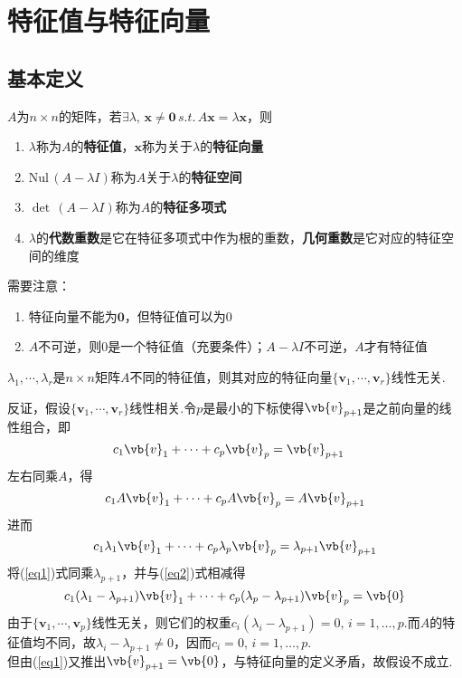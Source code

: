 
\section{特征值与特征向量}
\subsection{基本定义}
\begin{definition}$A$为$n\times n$的矩阵，若$\exists\lambda,\,\mathbf{x}\ne\mathbf{0}\,s.t.\,A\mathbf{x}=\lambda\mathbf{x}$，则
\begin{enumerate}
	\itemsep -2pt
	\item $\lambda$称为$A$的\textbf{特征值}，$\mathbf{x}$称为关于$\lambda$的\textbf{特征向量}
	\item $\mathrm{Nul}\,(A-\lambda I)$称为$A$关于$\lambda$的\textbf{特征空间}
	\item $\det\,(A-\lambda I)$称为$A$的\textbf{特征多项式}
	\item $\lambda$的\textbf{代数重数}是它在特征多项式中作为根的重数，\textbf{几何重数}是它对应的特征空间的维度
\end{enumerate}
\end{definition}
需要注意：
\begin{enumerate}
	\itemsep -3pt
	\item 特征向量不能为$\mathbf{0}$，但特征值可以为$0$
	\item $A$不可逆，则$0$是一个特征值（充要条件）；$A-\lambda I$不可逆，$A$才有特征值
\end{enumerate}
\begin{theorem}
\label{distinct_lambda}
$\lambda_1,\cdots,\lambda_r$是$n\times n$矩阵$A$不同的特征值，则其对应的特征向量$\{\mathbf{v}_1,\cdots,\mathbf{v}_r\}$线性无关.
\end{theorem}
\begin{analysis}
反证，假设$\{\mathbf{v}_1,\cdots,\mathbf{v}_r\}$线性相关.令$p$是最小的下标使得$\vb{v}_{p+1}$是之前向量的线性组合，即
\begin{equation}\label{eq1} c_1\vb{v}_1+\cdots+c_p\vb{v}_p=\vb{v}_{p+1}\quad\end{equation}
左右同乘$A$，得
\[c_1A\vb{v}_1+\cdots+c_pA\vb{v}_p=A\vb{v}_{p+1}\]
进而
\begin{equation}\label{eq2} c_1\lambda_1\vb{v}_1+\cdots+c_p\lambda_p\vb{v}_p=\lambda_{p+1}\vb{v}_{p+1}\end{equation}
将(\ref{eq1})式同乘$\lambda_{p+1}$，并与(\ref{eq2})式相减得
\[c_1(\lambda_1-\lambda_{p+1})\vb{v}_1+\cdots+c_p(\lambda_p-\lambda_{p+1})\vb{v}_p=\vb{0}\]
由于$\{\mathbf{v}_1,\cdots,\mathbf{v}_p\}$线性无关，则它们的权重$c_i(\lambda_i-\lambda_{p+1})=0,\,i=1,\dots,p$.而$A$的特征值均不同，故$\lambda_i-\lambda_{p+1}\ne 0$，因而$c_i=0,\,i=1,\dots,p$.\\
但由(\ref{eq1})又推出$\vb{v}_{p+1}=\vb{0}$，与特征向量的定义矛盾，故假设不成立.
\end{analysis}
